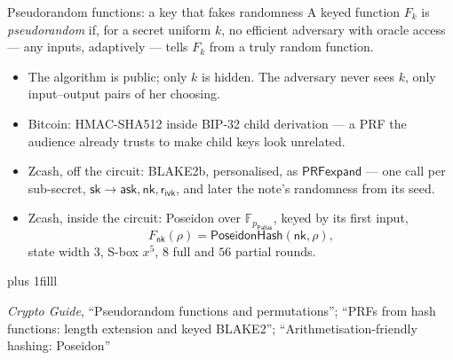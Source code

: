 \documentclass[aspectratio=169,11pt]{beamer}
\newcommand{\F}{\mathbb{F}}
\newcommand{\Pallas}{\ensuremath{\mathsf{Pallas}}}
\newcommand{\Fpp}{\ensuremath{\F_{p_{\Pallas}}}}
\newcommand{\nksym}{\ensuremath{\mathsf{nk}}}
\newcommand{\asksym}{\ensuremath{\mathsf{ask}}}
\newcommand{\rivk}{\ensuremath{\mathsf{r_{ivk}}}}
\newcommand{\src}[1]{\par\vskip0pt plus 1filll
  {\fontsize{6}{7.2}\selectfont\color{arbdim}\raggedright #1\par}}
\begin{document}
\begin{frame}{Pseudorandom functions: a key that fakes randomness}
A keyed function $F_{k}$ is \emph{pseudorandom} if, for a secret uniform
$k$, no efficient adversary with oracle access --- any inputs, adaptively
--- tells $F_{k}$ from a truly random function.
\begin{itemize}
  \item The algorithm is public; only $k$ is hidden. The adversary never
    sees $k$, only input--output pairs of her choosing.
  \item Bitcoin: HMAC-SHA512 inside BIP-32 child derivation --- a PRF the
    audience already trusts to make child keys look unrelated.
  \item Zcash, off the circuit: BLAKE2b, personalised, as
    $\mathsf{PRFexpand}$ --- one call per sub-secret,
    $\mathsf{sk} \to \asksym, \nksym, \rivk$, and later the note's
    randomness from its seed.
  \item Zcash, inside the circuit: Poseidon over $\Fpp$, keyed by its first
    input,
    \[
      F_{\nksym}(\rho) = \mathsf{PoseidonHash}(\nksym, \rho),
    \]
    state width $3$, S-box $x^{5}$, $8$ full and $56$ partial rounds.
\end{itemize}
\src{\emph{Crypto Guide}, ``Pseudorandom functions and permutations'';
  ``PRFs from hash functions: length extension and keyed BLAKE2'';
  ``Arithmetisation-friendly hashing: Poseidon''}
\end{frame}
\end{document}
